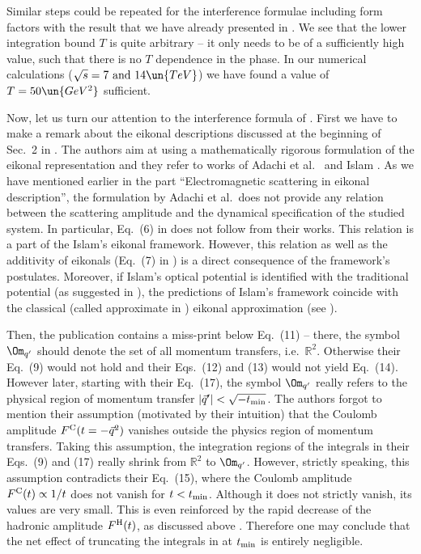 Similar steps could be repeated for the interference formulae including form factors with the result that we have already presented in . We see that the lower integration bound $T$ is quite arbitrary -- it only needs to be of a sufficiently high value, such that there is no $T$ dependence in the phase. In our numerical calculations ($\sqrt s = 7 \hbox{ and } 14\un{TeV}$) we have found a value of $T=50\un{GeV^2}$ sufficient.


Now, let us turn our attention to the interference formula of \KaL{}. First we have to make a remark about the eikonal descriptions discussed at the beginning of Sec.~2 in . The authors aim at using a mathematically rigorous formulation of the eikonal representation and they refer to works of Adachi et al.~ and Islam . As we have mentioned earlier in the part ``Electromagnetic scattering in eikonal description'', the formulation by Adachi et al.~does not provide any relation between the scattering amplitude and the dynamical specification of the studied system. In particular, Eq.~(6) in  does not follow from their works. This relation is a part of the Islam's eikonal framework. However, this relation as well as the additivity of eikonals (Eq.~(7) in ) is a direct consequence of the framework's postulates. Moreover, if Islam's optical potential is identified with the traditional potential (as suggested in ), the predictions of Islam's framework coincide with the classical (called approximate in ) eikonal approximation (see ).

Then, the publication  contains a miss-print below Eq.~(11) -- there, the symbol $\Om_{q'}$ should denote the set of all momentum transfers, i.e.~$\mathbb{R}^2$. Otherwise their Eq.~(9) would not hold and their Eqs.~(12) and (13) would not yield Eq.~(14). However later, starting with their Eq.~(17), the symbol $\Om_{q'}$ really refers to the physical region of momentum transfer $|\vec q'| < \sqrt{-t_{\rm min}}$. The authors forgot to mention their assumption (motivated by their intuition) that the Coulomb amplitude $F^{\rm C}(t = -\vec q^2)$ vanishes outside the physics region of momentum transfers. Taking this assumption, the integration regions of the integrals in their Eqs.~(9) and (17) really shrink from $\mathbb R^2$ to $\Om_{q'}$. However, strictly speaking, this assumption contradicts their Eq.~(15), where the Coulomb amplitude $F^{\rm C}(t) \propto 1/t$ does not vanish for $t < t_{\rm min}$. Although it does not strictly vanish, its values are very small. This is even reinforced by the rapid decrease of the hadronic amplitude $F^{\rm H}(t)$, as discussed above . Therefore one may conclude that the net effect of truncating the integrals in  at $t_{\rm min}$ is entirely negligible.

